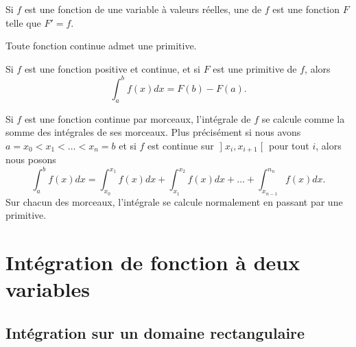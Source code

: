 \begin{definition}
    Si $f$ est une fonction de une variable à valeurs réelles, une  de $f$ est une fonction $F$ telle que $F'=f$.
\end{definition}

Toute fonction continue admet une primitive.

\begin{theorem}
    Si $f$ est une fonction positive et continue, et si $F$ est une primitive de $f$, alors
    \begin{equation}
        \int_a^bf(x)dx=F(b)-F(a).
    \end{equation}
\end{theorem}

\begin{remark}
    Si $f$ est une fonction continue par morceaux, l'intégrale de $f$ se calcule comme la somme des intégrales de ses morceaux. Plus précisément si nous avons $a=x_0<x_1<\ldots<x_n=b$ et si $f$ est continue sur $\mathopen] x_i , x_{i+1} \mathclose[$ pour tout $i$, alors nous posons
    \begin{equation}
        \int_a^bf(x)dx=\int_{x_0}^{x_1}f(x)dx+\int_{x_1}^{x_2}f(x)dx+\ldots+\int_{x_{n-1}}^{n_n}f(x)dx.
    \end{equation}
    Sur chacun des morceaux, l'intégrale se calcule normalement en passant par une primitive.
\end{remark}

\section{Intégration de fonction à deux variables}

\subsection{Intégration sur un domaine rectangulaire}
\label{PgRapIntMultFubiniRect}

